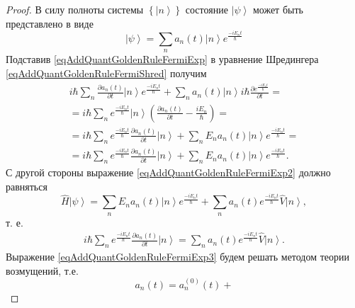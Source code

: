\begin{proof}
  В силу полноты системы $\left\{\left|n\right>\right\}$ состояние
  $\left|\psi\right>$ может быть представлено в виде
  \begin{equation}
    \left|\psi\right> = \sum_n a_n\left(t\right) \left|n\right>
    e^{\frac{-i E_n t}{\hbar}}
    \label{eqAddQuantGoldenRuleFermiExp}
  \end{equation}
  Подставив \eqref{eqAddQuantGoldenRuleFermiExp} в уравнение Шредингера
  \eqref{eqAddQuantGoldenRuleFermiShred} получим
  \begin{eqnarray}
    i \hbar \sum_n \frac{ \partial a_n\left(t\right)}{\partial t }
    \left|n\right> e^{\frac{-i E_n t}{\hbar}} +
    \sum_n a_n\left(t\right) \left|n\right>
    i \hbar \frac{\partial e^{\frac{-i E_n t}{\hbar}}}{ \partial t} =
    \\ \nonumber
    = i \hbar \sum_n  e^{\frac{-i E_n t}{\hbar}} \left|n\right> \left(
    \frac{ \partial a_n\left(t\right)}{\partial t } - \frac{i E_n}{\hbar} 
    \right) =
    \\ \nonumber
    =  i \hbar \sum_n  e^{\frac{-i E_n t}{\hbar}}
    \frac{ \partial a_n\left(t\right)}{\partial t } \left|n\right>+
    \sum_n E_n a_n\left(t\right) \left|n\right>
    e^{\frac{-i E_n t}{\hbar}} =
    \nonumber \\
    =
     i \hbar \sum_n  e^{\frac{-i E_n t}{\hbar}}
     \frac{ \partial a_n\left(t\right)}{\partial t } \left|n\right>+
      \sum_n E_n a_n\left(t\right) \left|n\right>
    e^{\frac{-i E_n t}{\hbar}}.
    \label{eqAddQuantGoldenRuleFermiExp2}
  \end{eqnarray}
  С другой стороны выражение \eqref{eqAddQuantGoldenRuleFermiExp2}
  должно равняться
  \begin{equation}
    \hat{H} \left|\psi\right> =
    \sum_n E_n a_n\left(t\right) \left|n\right>
    e^{\frac{-i E_n t}{\hbar}} +
    \sum_n  a_n\left(t\right) 
    e^{\frac{-i E_n t}{\hbar}} \hat{V} \left|n\right>,
    \nonumber
  \end{equation}
  т. е.
  \begin{eqnarray}
    i \hbar \sum_n  e^{\frac{-i E_n t}{\hbar}}
    \frac{ \partial a_n\left(t\right)}{\partial t } \left|n\right> =
     \sum_n  a_n\left(t\right) 
    e^{\frac{-i E_n t}{\hbar}} \hat{V} \left|n\right>.
    \label{eqAddQuantGoldenRuleFermiExp3}
  \end{eqnarray}
  Выражение \eqref{eqAddQuantGoldenRuleFermiExp3} будем решать
  методом теории возмущений, т.е.
  \begin{equation}
    a_n\left(t\right) = a_n^{(0)}\left(t\right) +

\end{equation}
\end{proof}
